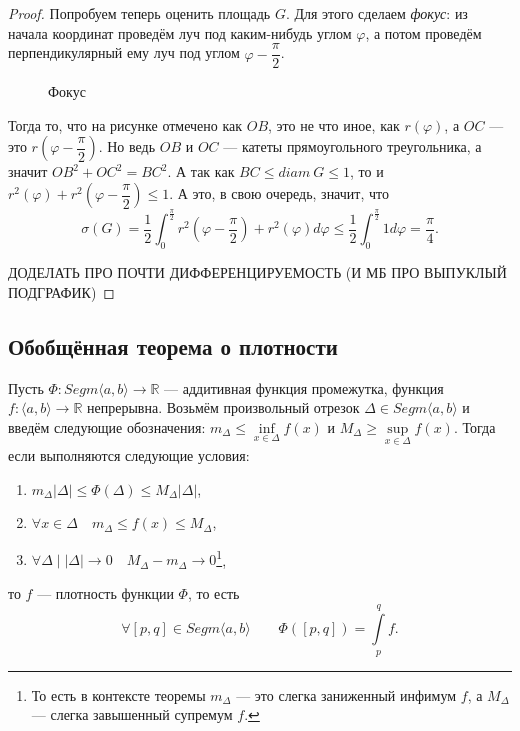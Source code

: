 \begin{proof}
	Попробуем теперь оценить площадь \(G\).	Для этого сделаем \textit{фокус}: из начала координат проведём луч под каким-нибудь углом \(\varphi\), а потом проведём перпендикулярный ему луч под углом \(\varphi - \dfrac{\pi}{2}\).
	\begin{figure}[h!]
		\caption{Фокус}
	\end{figure}
	
	Тогда то, что на рисунке отмечено как \(OB\), это не что иное, как \(r(\varphi)\), а \(OC\) --- это \(r \left(\varphi - \dfrac{\pi}{2} \right)\). Но ведь \(OB\) и \(OC\) --- катеты прямоугольного треугольника, а значит \({OB}^2 + {OC}^2 = {BC}^2\). А так как \(BC \leqslant diam \ G \leqslant 1\), то и \(r^2(\varphi) + r^2 \left(\varphi - \dfrac{\pi}{2} \right) \leqslant 1\). А это, в свою очередь, значит, что \[
		\sigma(G) = \frac{1}{2} \int_{0}^{\frac{\pi}{2}} r^2 \left(\varphi - \frac{\pi}{2} \right) +  r^2(\varphi) d\varphi \leqslant \frac{1}{2} \int_{0}^{\frac{\pi}{2}} 1 d\varphi = \frac{\pi}{4}.
	\]
	
	ДОДЕЛАТЬ ПРО ПОЧТИ ДИФФЕРЕНЦИРУЕМОСТЬ (И МБ ПРО ВЫПУКЛЫЙ ПОДГРАФИК)
\end{proof}

\subsection{Обобщённая теорема о плотности}

\hypertarget{plotn}{}
\begin{theorem}
	Пусть \(\Phi \colon Segm \langle a, b \rangle \to \mathbb{R}\) --- аддитивная функция промежутка, функция \(f \colon \langle a, b \rangle \to \mathbb{R}\) непрерывна. Возьмём произвольный отрезок \(\Delta \in Segm \langle a, b \rangle\) и введём следующие обозначения: \(m_\Delta \leqslant \inf\limits_{x \in \Delta} f(x)\) и \(M_\Delta \geqslant \sup\limits_{x \in \Delta} f(x)\). Тогда если выполняются следующие условия:
	\begin{enumerate}
		\item \label{plotn_1} \(m_\Delta |\Delta| \leqslant \Phi(\Delta) \leqslant M_\Delta |\Delta|\),
		\item \label{plotn_2} \(\forall x \in \Delta \quad m_\Delta \leqslant f(x) \leqslant M_\Delta\),
		\item \label{plotn_3} \(\forall \Delta \mid |\Delta| \to 0 \quad M_\Delta - m_\Delta \to 0\)\footnote{То есть в контексте теоремы \(m_\Delta\) --- это слегка заниженный инфимум \(f\), а \(M_\Delta\) --- слегка завышенный супремум \(f\).},
	\end{enumerate}
	то \(f\) --- плотность функции \(\Phi\), то есть \[
		\forall [p, q] \in Segm \langle a, b \rangle \qquad \Phi([p, q]) = \int\limits_p^q f.
	\]
\end{theorem}

